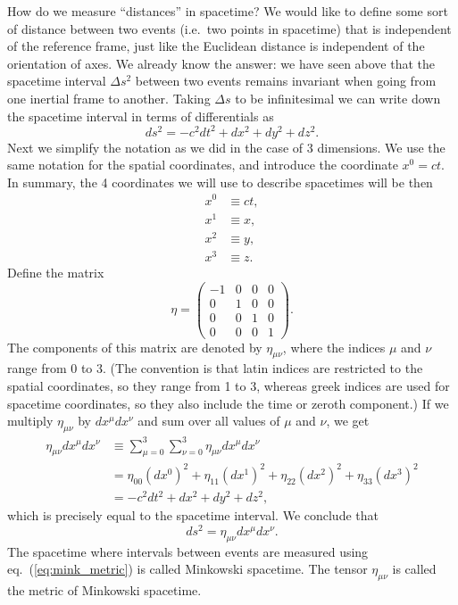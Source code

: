 How do we measure ``distances'' in spacetime? We would like to define some sort of distance between two events (i.e.\ two points in spacetime) that is independent of the reference frame, just like the Euclidean distance is independent of the orientation of axes. We already know the answer: we have seen above that the spacetime interval $\Delta s^2$ between two events remains invariant when going from one inertial frame to another. Taking $\Delta s$ to be infinitesimal we can write down the spacetime interval in terms of differentials as
\begin{equation}
ds^2=-c^2dt^2+dx^2+dy^2+dz^2.
\end{equation}
Next we simplify the notation as we did in the case of 3 dimensions. We use the same notation for the spatial coordinates, and introduce the coordinate $x^0=ct$. In summary, the 4 coordinates we will use to describe spacetimes will be then
\begin{equation}
\begin{split}
x^0&\equiv ct,\\
x^1&\equiv x,\\
x^2&\equiv y,\\
x^3&\equiv z.
\end{split}
\end{equation}
Define the matrix
\begin{equation}
\label{etamunu}
\eta=\left( \begin{array}{cccc} -1 & 0 & 0 & 0 \\ 
0 & 1 & 0 & 0 \\
0 & 0 & 1 & 0 \\
0 & 0 & 0 & 1\end{array} \right).
\end{equation}
The components of this matrix are denoted by $\eta_{\mu\nu}$, where the indices $\mu$ and $\nu$ range from $0$ to $3$. (The convention is that latin indices are restricted to the spatial coordinates, so they range from 1 to 3, whereas greek indices are used for spacetime coordinates, so they also include the time or zeroth component.) If we multiply $\eta_{\mu\nu}$ by $dx^{\mu}dx^{\nu}$ and sum over all values of $\mu$ and $\nu$, we get
\begin{equation}
\begin{split}
\eta_{\mu\nu}dx^{\mu}dx^{\nu}&\equiv \sum_{\mu=0}^3\sum_{\nu=0}^3 \eta_{\mu\nu}dx^{\mu}dx^{\nu}\\
&=\eta_{00}(dx^0)^2+\eta_{11}(dx^1)^2+\eta_{22}(dx^2)^2+\eta_{33}(dx^3)^2\\
&=-c^2dt^2+dx^2+dy^2+dz^2,
\end{split}
\end{equation}
which is precisely equal to the spacetime interval. We conclude that
\begin{equation} \label{eq:mink_metric}
ds^2=\eta_{\mu\nu}dx^{\mu}dx^{\nu}.
\end{equation}
The spacetime where intervals between events are measured using eq.\ (\ref{eq:mink_metric}) is called Minkowski spacetime. The tensor $\eta_{\mu\nu}$ is called the metric of Minkowski spacetime.

